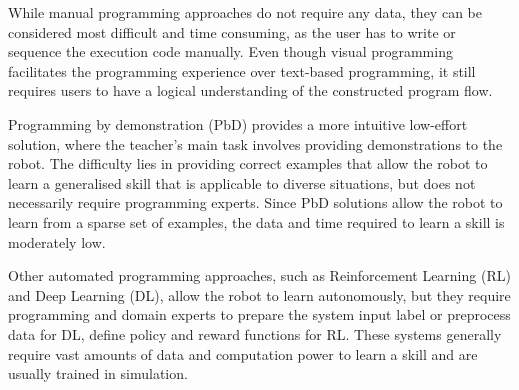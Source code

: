 While manual programming approaches do not require any data, they can be considered most difficult and time consuming, as the user has to write or sequence the execution code manually.
Even though visual programming facilitates the programming experience over text-based programming, it still requires users to have a logical understanding of the constructed program flow.

Programming by demonstration (PbD) provides a more intuitive low-effort solution, where the teacher's main task involves providing demonstrations to the robot.
The difficulty lies in providing correct examples that allow the robot to learn a generalised skill that is applicable to diverse situations, but does not necessarily require programming experts.
Since PbD solutions allow the robot to learn from a sparse set of examples, the data and time required to learn a skill is moderately low.

Other automated programming approaches, such as Reinforcement Learning (RL) and Deep Learning (DL), allow the robot to learn autonomously, but they require programming and domain experts to prepare the system input \eg label or preprocess data for DL, define policy and reward functions for RL. %
These systems generally require vast amounts of data and computation power to learn a skill and are usually trained in simulation.




